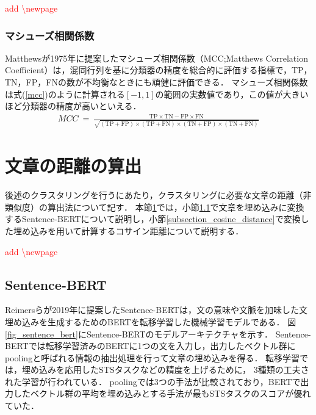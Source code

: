 \documentclass[12pt,a4j]{jreport}
\begin{document}
\textcolor{red}{add \textbackslash newpage}
\newpage

\subsubsection{マシューズ相関係数}
\label{subsubsection_mcc}
Matthewsが1975年に提案したマシューズ相関係数（MCC;Matthews Correlation Coefficient）は，混同行列を基に分類器の精度を総合的に評価する指標で，TP，TN，FP，FNの数が不均衡なときにも頑健に評価できる\cite{chicco_advantages_2020}．
マシューズ相関係数は式(\ref{mcc})のように計算される$[-1, 1]$の範囲の実数値であり，この値が大きいほど分類器の精度が高いといえる．
\begin{align}
  MCC ~=~ \frac{\mathrm{TP} \times \mathrm{TN}-\mathrm{FP} \times \mathrm{FN}}{\sqrt{(\mathrm{TP}+\mathrm{FP}) \times(\mathrm{TP}+\mathrm{FN}) \times(\mathrm{TN}+\mathrm{FP}) \times(\mathrm{TN}+\mathrm{FN})}}
  \label{mcc}
\end{align}


\section{文章の距離の算出}
\label{section_sentence_distance}
後述のクラスタリングを行うにあたり，クラスタリングに必要な文章の距離（非類似度）の算出法について記す．
本節\ref{section_sentence_distance}では，小節\ref{subsection_sentence_bert}で文章を埋め込みに変換するSentence-BERTについて説明し，小節\ref{subsection_cosine_distance}で変換した埋め込みを用いて計算するコサイン距離について説明する．

\textcolor{red}{add \textbackslash newpage}
\newpage

\subsection{Sentence-BERT}
\label{subsection_sentence_bert}
Reimersらが2019年に提案したSentence-BERTは，文の意味や文脈を加味した文埋め込みを生成するためのBERTを転移学習した機械学習モデルである\cite{reimers_sentence-bert_2019}．
図\ref{fig_sentence_bert}にSentence-BERTのモデルアーキテクチャを示す．
Sentence-BERTでは転移学習済みのBERTに1つの文を入力し，出力したベクトル群にpoolingと呼ばれる情報の抽出処理を行って文章の埋め込みを得る．
転移学習では，埋め込みを応用したSTSタスクなどの精度を上げるために，
3種類の工夫された学習が行われている．
poolingでは3つの手法が比較されており，BERTで出力したベクトル群の平均を埋め込みとする手法が最もSTSタスクのスコアが優れていた．
\end{document}
